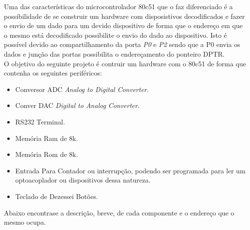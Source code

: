 \documentclass{Fabiano_file}
\begin{document}
Uma das características do microcontrolador 80c51 que o faz diferenciado é a possibilidade de se construir um hardware com disposistivos decodificados e fazer
o envio de um dado para um devido dispositivo de forma que o endereço em que o mesmo está decodificado possibilite o envio do dado ao dispositivo. Isto é possível
devido ao compartilhamento da porta \textit{P0} e \textit{P2} sendo que a P0 envia os dados e junção das portas possibilita o endereçamento do ponteiro DPTR.\\
O objetivo do seguinte projeto é contruir um hardware com o 80c51 de forma que contenha os seguintes periféricos:\\
\begin{itemize}
 \item Conversor ADC \textit{Analog to Digital Converter}.
 \item Conver DAC \textit{Digital to Analog Converter}.
 \item RS232 Terminal.
 \item Memória Ram de 8k.
 \item Memória Rom de 8k.
 \item Entrada Para Contador ou interrupção, podendo ser programada para ler um optoacoplador ou dispositivos dessa natureza.
 \item Teclado de Dezessei Botões.
 \\
\end{itemize}
 Abaixo encontrase a descrição, breve, de cada componente e o endereço que o mesmo ocupa.
\end{document}
